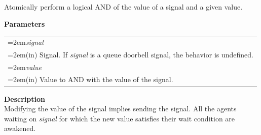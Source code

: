 \documentclass[final]{book}
\newcommand{\hsaarg}[1]{\textit{#1}}
\begin{document}
Atomically perform a logical AND of the value of a signal and a given value.

\noindent\textbf{Parameters}\\[-6mm]
\noindent\begin{longtable}{@{}>{\hangindent=2em}p{\textwidth}}
\hsaarg{signal}\\\hspace{2em}(in) Signal. If \textit{signal} is a queue doorbell signal, the behavior is undefined.\\[2mm]
\hsaarg{value}\\\hspace{2em}(in) Value to AND with the value of the signal.
\end{longtable}
\noindent\textbf{Description}\\[1mm]
Modifying the value of the signal implies sending the signal. All the agents waiting on \textit{signal} for which the new value satisfies their wait condition are awakened. 
\end{document}
